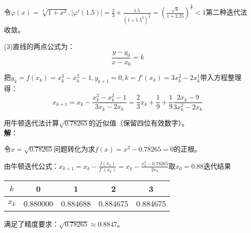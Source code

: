 \documentclass[UTF8,a4paper,11pt,oneside]{ctexbook}
\begin{document}
令\(\varphi(x)=\sqrt[3]{1+x^2},|\varphi'(1.5)|=\frac{2}{3}\times\frac{1.5}{(1+1.5^2)^\frac{2}{3}}=(\frac{\sqrt{8}}{1+2.25})^\frac{2}{3}<1\)第二种迭代法收敛。

(3)直线的两点公式为：
\[
\frac{y-y_0}{x-x_0}=k
\]

把\(y_k=f(x_k)=x_k^3-x_k^2-1,y_{k+1}=0,k=f'(x_k)=3x_k^2-2x_k^1\)带入方程整理得：
\[
x_{k+1}=x_k-\frac{x_k^3-x_k^2-1}{3x_k-2x_k}=\frac{2}{3}x_k+\frac{1}{9}+\frac{1}{9}\frac{2x_k-9}{3x_k^2-2x_k}
\]

\vspace{4em}
用牛顿迭代法计算\(\sqrt{0.78265}\)的近似值（保留四位有效数字）。\\
\textbf{解}：

令\(x=\sqrt{0.78265}\)问题转化为求\(f(x)=x^2-0.78265=0\)的正根。

由牛顿迭代公式：\(x_{k+1}=x_k-\frac{f(x_k)}{f'(x_k)}=x_k-\frac{x_k^2-0.78265}{2x_k}\)取\(x_0=0.88\)迭代结果
\begin{center}
    \begin{tabular}{|c|c|c|c|c|}
        \hline
        \(k\) & 0 & 1 & 2 & 3 \\
        \hline
        \(x_k\) & 0.880000 & 0.884688 & 0.884675 & 0.884675 \\
        \hline
    \end{tabular}
\end{center}

满足了精度要求：\(\sqrt{0.78265}\approx0.8847\)。
\end{document}
